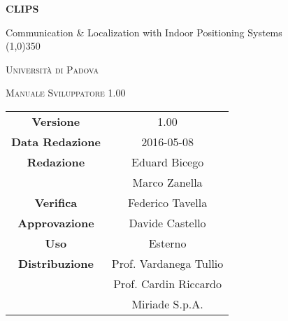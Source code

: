 \documentclass[a4paper,12pt]{article}
\author{Eduard Bicego}
\date{08/05/2016}
\begin{document}
\begin{titlepage}
	\centering
	{\huge\bfseries CLIPS\par}
	Communication \& Localization with Indoor Positioning Systems \\
	\line(1,0){350} \\
	{\scshape\LARGE Università di Padova \par}
	\vspace{1cm}
	{\scshape\Large Manuale Sviluppatore 1.00 \par}
	\logo
	\newpage
	\begin{tabular}{c|c}
		{\hfill \textbf{Versione}} 			& 1.00						\\
		{\hfill\textbf{Data Redazione}} 	& 2016-05-08  				\\
		{\hfill\textbf{Redazione}} 			& Eduard Bicego				\\
											& Marco Zanella				\\
		{\hfill\textbf{Verifica}} 			& Federico Tavella			\\
		{\hfill\textbf{Approvazione}} 		& Davide Castello			\\
		{\hfill\textbf{Uso}} 				& Esterno					\\
		{\hfill\textbf{Distribuzione}} 		& Prof. Vardanega Tullio	\\
											& Prof. Cardin Riccardo 	\\
											& Miriade S.p.A. 			\\
	\end{tabular}
\end{titlepage}
	
	\newpage
	\pagestyle{myfront}
	
		\newpage
			
		\newpage
			\tableofcontents
		\newpage
			\listoffigures
	\label{LastFrontPage}

	\newpage
		\pagestyle{mymain}
	\newpage
		
	\newpage
		
	\newpage
		
	\newpage
		
	\newpage
		
	\newpage
		
	\newpage
		
		
	\newpage
		


		
	\label{LastPage}
\end{document}
